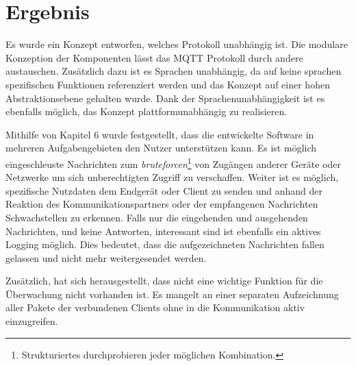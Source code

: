 \chapter{Ergebnis} %

Es wurde ein Konzept entworfen, welches Protokoll unabhängig ist. Die modulare Konzeption der Komponenten lässt das \ac{MQTT} Protokoll durch andere austauschen. Zusätzlich dazu ist es Sprachen unabhängig, da auf keine sprachen spezifischen Funktionen referenziert werden und das Konzept auf einer hohen Abstraktionsebene gehalten wurde. Dank der Sprachenunabhängigkeit ist es ebenfalls möglich, das Konzept plattformunabhängig zu realisieren.

Mithilfe von Kapitel 6 wurde festgestellt, dass die entwickelte Software in mehreren Aufgabengebieten den Nutzer unterstützen kann.
Es ist möglich eingeschleuste Nachrichten zum \emph{bruteforcen}\footnote{Strukturiertes durchprobieren jeder möglichen Kombination.} von Zugängen anderer Geräte oder Netzwerke um sich unberechtigten Zugriff zu verschaffen.
Weiter ist es möglich, spezifische Nutzdaten dem Endgerät oder Client zu senden und anhand der Reaktion des Kommunikationspartners oder der empfangenen Nachrichten Schwachstellen zu erkennen.
Falls nur die eingehenden und ausgehenden Nachrichten, und keine Antworten, interessant sind ist ebenfalls ein aktives Logging möglich. Dies bedeutet, dass die aufgezeichneten Nachrichten fallen gelassen und nicht mehr weitergesendet werden.

Zusätzlich, hat sich herausgestellt, dass nicht eine wichtige Funktion für die Überwachung nicht vorhanden ist. Es mangelt an einer separaten Aufzeichnung aller Pakete der verbundenen Clients ohne in die Kommunikation aktiv einzugreifen.
